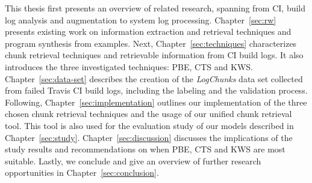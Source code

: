 \documentclass[\myrootdir/main.tex]{subfiles}
\begin{document}
This thesis first presents an overview of related research, spanning from CI, build log analysis and augmentation to system log processing.
Chapter~\ref{sec:rw} presents existing work on information extraction and retrieval techniques and program synthesis from examples.
Next, Chapter~\ref{sec:techniques} characterizes chunk retrieval techniques and retrievable information from CI build logs.
It also introduces the three investigated techniques: PBE, CTS and KWS\@.
Chapter~\ref{sec:data-set} describes the creation of the \emph{LogChunks} data set collected from failed Travis CI build logs, including the labeling and the validation process.
Following, Chapter~\ref{sec:implementation} outlines our implementation of the three chosen chunk retrieval techniques and the usage of our unified chunk retrieval tool.
This tool is also used for the evaluation study of our models described in Chapter~\ref{sec:study}.
Chapter~\ref{sec:discussion} discusses the implications of the study results and recommendations on when PBE, CTS and KWS are most suitable.
Lastly, we conclude and give an overview of further research opportunities in Chapter~\ref{sec:conclusion}.
\end{document}

